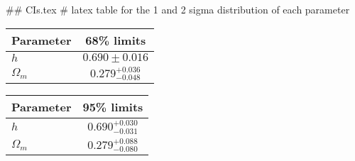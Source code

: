 ## CIs.tex
# latex table for the 1 and 2 sigma distribution of each parameter

\begin{tabular} { l  c}
 Parameter &  68\% limits\\
\hline
{\boldmath$h              $} & $0.690\pm 0.016            $\\
{\boldmath$\Omega_m       $} & $0.279^{+0.036}_{-0.048}   $\\
\hline
\end{tabular}

\begin{tabular} { l  c}
 Parameter &  95\% limits\\
\hline
{\boldmath$h              $} & $0.690^{+0.030}_{-0.031}   $\\
{\boldmath$\Omega_m       $} & $0.279^{+0.088}_{-0.080}   $\\
\hline
\end{tabular}
